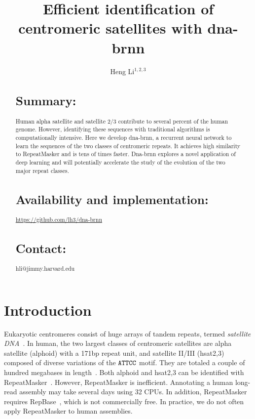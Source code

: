 \documentclass{bioinfo}
\begin{document}

\title{Efficient identification of centromeric satellites with dna-brnn}
\author[Li]{Heng Li$^{1,2,3}$}
\address{$^1$ Department of data sciences, Dana-Farber Cancer Institute, 450 Brookline Ave, Boston, MA 02115, USA\\
$^2$ Department of biomedical informatics, Havard Medical School, 25 Shattuck Street, Boston, MA 02115, USA\\
$^3$ Broad Institute, 415 Main St, Cambridge, MA 02142, USA}

\maketitle

\begin{abstract}

\section{Summary:} Human alpha satellite and satellite 2/3 contribute to
several percent of the human genome. However, identifying these sequences with
traditional algorithms is computationally intensive. Here we develop dna-brnn,
a recurrent neural network to learn the sequences of the two classes of
centromeric repeats. It achieves high similarity to RepeatMasker and is tens of
times faster. Dna-brnn explores a novel application of deep learning and will
potentially accelerate the study of the evolution of the two major repeat classes.

\section{Availability and implementation:}
\href{https://github.com/lh3/dna-brnn}{https://github.com/lh3/dna-brnn}

\section{Contact:} hli@jimmy.harvard.edu
\end{abstract}

\section{Introduction}

Eukaryotic centromeres consist of huge arrays of tandem repeats, termed
\emph{satellite DNA}~\citep{Garrido-Ramos:2017aa}. In human, the two largest
classes of centromeric satellites are alpha satellite (alphoid) with a 171bp
repeat unit, and satellite II/III (hsat2,3) composed of diverse variations of
the ${\tt ATTCC}$ motif. They are totaled a couple of hundred megabases in
length~\citep{Schneider:2017aa}. Both alphoid and hsat2,3 can be identified
with RepeatMasker~\citep{Tarailo-Graovac:2009aa}. However, RepeatMasker is
inefficient. Annotating a human long-read assembly may take several days using
32 CPUs. In addition, RepeatMasker requires RepBase~\citep{Kapitonov:2008aa},
which is not commercially free. In practice, we do not often apply RepeatMasker
to human assemblies.
\end{document}
